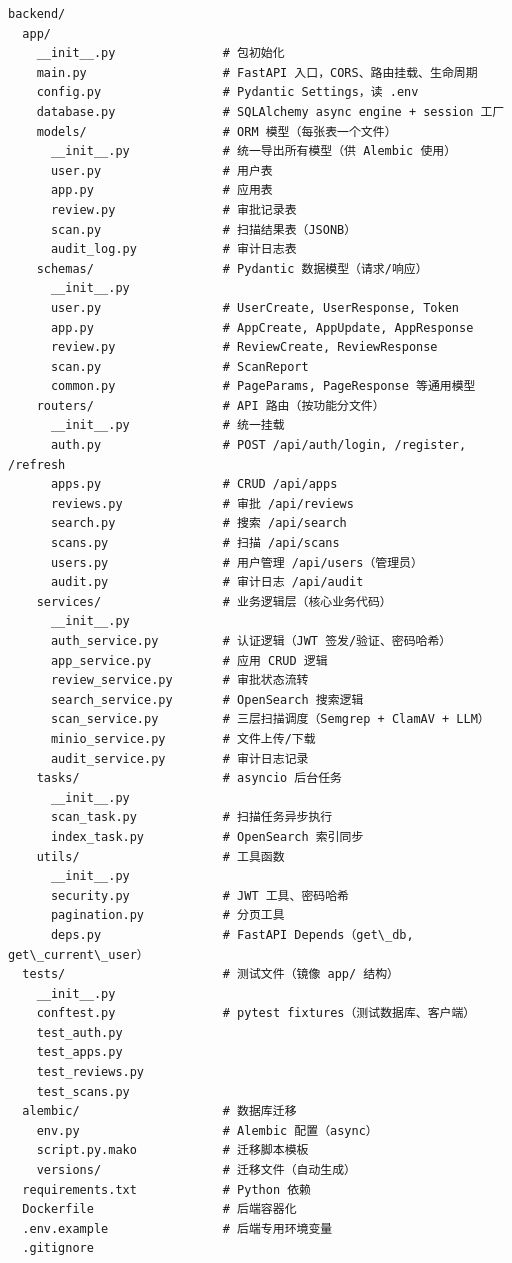 \documentclass[11pt,a4paper]{article}
\begin{document}
\begin{lstlisting}[basicstyle=\ttfamily\footnotesize, frame=single]
backend/
  app/
    __init__.py               # 包初始化
    main.py                   # FastAPI 入口，CORS、路由挂载、生命周期
    config.py                 # Pydantic Settings，读 .env
    database.py               # SQLAlchemy async engine + session 工厂
    models/                   # ORM 模型（每张表一个文件）
      __init__.py             # 统一导出所有模型（供 Alembic 使用）
      user.py                 # 用户表
      app.py                  # 应用表
      review.py               # 审批记录表
      scan.py                 # 扫描结果表（JSONB）
      audit_log.py            # 审计日志表
    schemas/                  # Pydantic 数据模型（请求/响应）
      __init__.py
      user.py                 # UserCreate, UserResponse, Token
      app.py                  # AppCreate, AppUpdate, AppResponse
      review.py               # ReviewCreate, ReviewResponse
      scan.py                 # ScanReport
      common.py               # PageParams, PageResponse 等通用模型
    routers/                  # API 路由（按功能分文件）
      __init__.py             # 统一挂载
      auth.py                 # POST /api/auth/login, /register, /refresh
      apps.py                 # CRUD /api/apps
      reviews.py              # 审批 /api/reviews
      search.py               # 搜索 /api/search
      scans.py                # 扫描 /api/scans
      users.py                # 用户管理 /api/users（管理员）
      audit.py                # 审计日志 /api/audit
    services/                 # 业务逻辑层（核心业务代码）
      __init__.py
      auth_service.py         # 认证逻辑（JWT 签发/验证、密码哈希）
      app_service.py          # 应用 CRUD 逻辑
      review_service.py       # 审批状态流转
      search_service.py       # OpenSearch 搜索逻辑
      scan_service.py         # 三层扫描调度（Semgrep + ClamAV + LLM）
      minio_service.py        # 文件上传/下载
      audit_service.py        # 审计日志记录
    tasks/                    # asyncio 后台任务
      __init__.py
      scan_task.py            # 扫描任务异步执行
      index_task.py           # OpenSearch 索引同步
    utils/                    # 工具函数
      __init__.py
      security.py             # JWT 工具、密码哈希
      pagination.py           # 分页工具
      deps.py                 # FastAPI Depends（get\_db, get\_current\_user）
  tests/                      # 测试文件（镜像 app/ 结构）
    __init__.py
    conftest.py               # pytest fixtures（测试数据库、客户端）
    test_auth.py
    test_apps.py
    test_reviews.py
    test_scans.py
  alembic/                    # 数据库迁移
    env.py                    # Alembic 配置（async）
    script.py.mako            # 迁移脚本模板
    versions/                 # 迁移文件（自动生成）
  requirements.txt            # Python 依赖
  Dockerfile                  # 后端容器化
  .env.example                # 后端专用环境变量
  .gitignore
\end{lstlisting}
\end{document}
